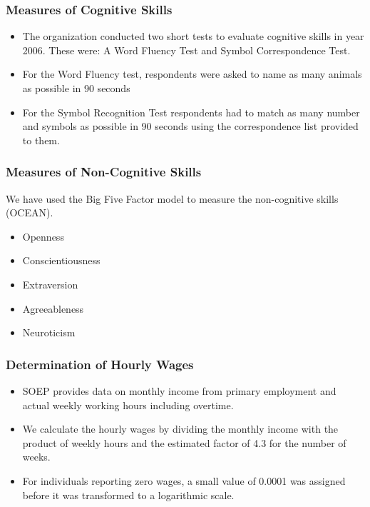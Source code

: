 \documentclass[11pt]{beamer}
\begin{document}
\begin{frame}[t]
	\frametitle{Measures of Cognitive Skills}
	 \begin{itemize}
	 	\item The organization conducted two short tests to evaluate cognitive
skills in year 2006. These were: A Word Fluency Test and Symbol
Correspondence Test.

		\item For the Word Fluency test, respondents were asked to name as many
animals as possible in 90 seconds

		\item For the Symbol Recognition Test respondents had to match as many
number and symbols as possible in 90 seconds using the
correspondence list provided to them.
	\end{itemize}
\end{frame}

\begin{frame}[t]
	\frametitle{Measures of Non-Cognitive Skills}
	We have used the Big Five Factor model to measure the
non-cognitive skills (OCEAN).

	 \begin{itemize}
	 	
		\item Openness

		\item Conscientiousness

		\item Extraversion

		\item Agreeableness

		\item Neuroticism
	 \end{itemize}
\end{frame}

\begin{frame}[t]
	\frametitle{Determination of Hourly Wages}
	 \begin{itemize}
	 	\item SOEP provides data on monthly income from primary employment
and actual weekly working hours including overtime.

		\item We calculate the hourly wages by dividing the monthly income with
the product of weekly hours and the estimated factor of 4.3 for the
number of weeks.

		\item For individuals reporting zero wages, a small value of 0.0001 was
assigned before it was transformed to a logarithmic scale.
	\end{itemize}
\end{frame}
\end{document}
